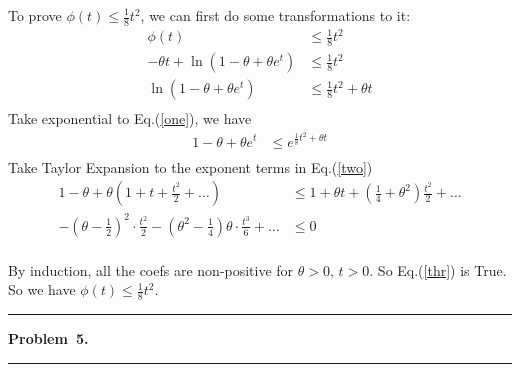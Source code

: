 \documentclass[10.5pt]{article}
\newcommand\question[1]{\vspace{.2in}\hrule\vspace{0.04in}\textbf{Problem\ #1.}\vspace{.4em}\hrule\vspace{.10in}}
\begin{document}
\begin{enumerate}[(a)]
	To prove $\phi(t)\leqslant\frac{1}{8}t^2$, we can first do some transformations to it:
	\begin{align}
		\phi(t)&\leqslant\frac{1}{8}t^2\nonumber\\[8pt]
		-\theta t + \ln(1-\theta+\theta e^t)&\leqslant \frac{1}{8}t^2\nonumber\\[8pt]
		\ln(1-\theta+\theta e^t)&\leqslant \frac{1}{8}t^2+\theta t\label{one}\\[8pt]\nonumber
	\end{align}
	Take exponential to Eq.(\ref{one}), we have
	\begin{align}
		1-\theta+\theta e^t&\leqslant e^{\frac{1}{8}t^2+\theta t}\label{two}\\[8pt]\nonumber
	\end{align}
	Take Taylor Expansion to the exponent terms in Eq.(\ref{two})
	\begin{align}
		1-\theta+\theta(1+t+\frac{t^2}{2}+\dots)&\leqslant 1+\theta t + (\frac{1}{4}+\theta^2)\frac{t^2}{2}+\dots\nonumber\\[8pt]
		-(\theta-\frac{1}{2})^2\cdot\frac{t^2}{2} -(\theta^2-\frac{1}{4})\theta\cdot\frac{t^3}{6}+ \dots &\leqslant 0\label{thr}\\[8pt]\nonumber
	\end{align}

	By induction, all the coefs are non-positive for $\theta > 0,\,t>0$. So Eq.(\ref{thr}) is True.
	So we have $\phi(t)\leqslant\frac{1}{8}t^2$.
\pagebreak
	\question{5}


\end{enumerate}
\end{document}
